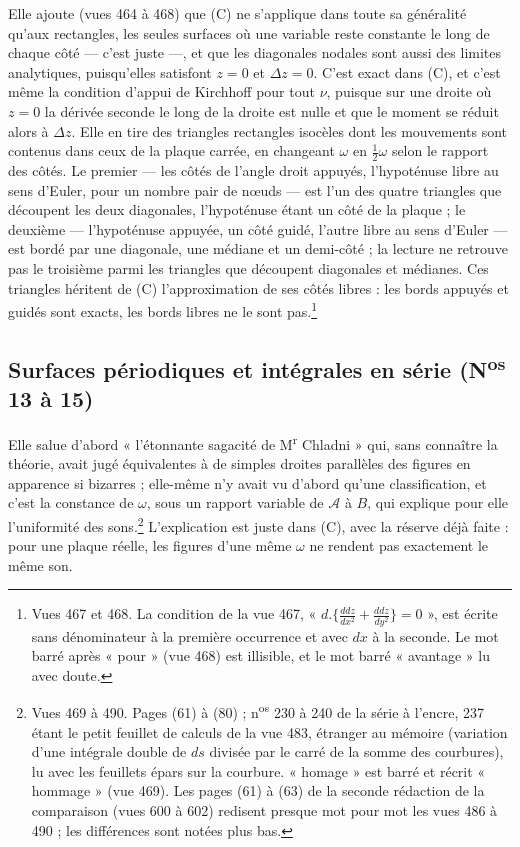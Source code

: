 \documentclass[11pt,a4paper]{article}
\begin{document}
Elle ajoute (vues 464 à 468) que (C) ne s'applique dans toute sa généralité qu'aux
rectangles, les seules surfaces où une variable reste constante le long de chaque côté
— c'est juste —, et que les diagonales nodales sont aussi des limites analytiques,
puisqu'elles satisfont $z = 0$ et $\Delta z = 0$. C'est exact dans (C), et c'est même la
condition d'appui de Kirchhoff pour tout $\nu$, puisque sur une droite où $z = 0$ la
dérivée seconde le long de la droite est nulle et que le moment se réduit alors à
$\Delta z$. Elle en tire des triangles rectangles isocèles dont les mouvements sont
contenus dans ceux de la plaque carrée, en changeant $\omega$ en $\frac12\omega$ selon le
rapport des côtés. Le premier — les côtés de l'angle droit appuyés, l'hypoténuse libre
au sens d'Euler, pour un nombre pair de nœuds — est l'un des quatre triangles que
découpent les deux diagonales, l'hypoténuse étant un côté de la plaque ; le deuxième —
l'hypoténuse appuyée, un côté guidé, l'autre libre au sens d'Euler — est bordé par une
diagonale, une médiane et un demi-côté ; la lecture ne retrouve pas le troisième parmi
les triangles que découpent diagonales et médianes. Ces triangles héritent de (C)
l'approximation de ses côtés libres : les bords appuyés et guidés sont exacts, les
bords libres ne le sont pas.\footnote{Vues 467 et 468. La condition de la vue 467,
« $d.\{\frac{ddz}{dx^2}+\frac{ddz}{dy^2}\}=0$ », est écrite sans dénominateur à la
première occurrence et avec $dx$ à la seconde. Le mot barré après « pour » (vue 468)
est illisible, et le mot barré « avantage » lu avec doute.}

\subsection*{Surfaces périodiques et intégrales en série (N\textsuperscript{os} 13 à 15)}

Elle salue d'abord « l'étonnante sagacité de M\textsuperscript{r} Chladni » qui,
sans connaître la théorie, avait jugé équivalentes à de simples droites parallèles des
figures en apparence si bizarres ; elle-même n'y avait vu d'abord qu'une
classification, et c'est la constance de $\omega$, sous un rapport variable de
$\mathcal{A}$ à $B$, qui explique pour elle l'uniformité des sons.\footnote{Vues 469
à 490. Pages (61) à (80) ; n\textsuperscript{os} 230 à 240 de la série à l'encre, 237
étant le petit feuillet de calculs de la vue 483, étranger au mémoire (variation d'une
intégrale double de $ds$ divisée par le carré de la somme des courbures), lu avec les
feuillets épars sur la courbure. « homage » est barré et récrit « hommage » (vue 469).
Les pages (61) à (63) de la seconde rédaction de la comparaison (vues 600 à 602)
redisent presque mot pour mot les vues 486 à 490 ; les différences sont notées plus
bas.} L'explication est juste dans (C), avec la réserve déjà faite : pour une plaque
réelle, les figures d'une même $\omega$ ne rendent pas exactement le même son.
\end{document}
